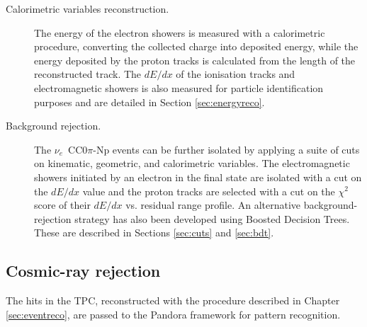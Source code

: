 \begin{description}
\item[Calorimetric variables reconstruction.] The energy of the electron showers is measured with a calorimetric procedure, converting the collected charge into deposited energy, while the energy deposited by the proton tracks is calculated from the length of the reconstructed track. The $dE/dx$ of the ionisation tracks and electromagnetic showers is also measured for particle identification purposes and are detailed in Section \ref{sec:energyreco}.

\item[Background rejection.] The $\nu_{e}$~CC0$\pi$-Np events can be further isolated by applying a suite of cuts on kinematic, geometric, and calorimetric variables. The electromagnetic showers initiated by an electron in the final state are isolated with a cut on the $dE/dx$ value and the proton tracks are selected with a cut on the $\chi^{2}$ score of their $dE/dx$ vs. residual range profile. An alternative background-rejection strategy has also been developed using Boosted Decision Trees. These are described in Sections \ref{sec:cuts} and \ref{sec:bdt}.
\end{description}

\subsection{Cosmic-ray rejection}\label{sec:cosmicremoval}
The hits in the TPC, reconstructed with the procedure described in Chapter \ref{sec:eventreco}, are passed to the Pandora framework for pattern recognition. %

